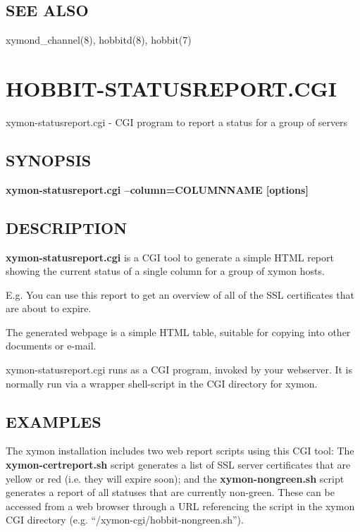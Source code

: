 \subsection{SEE ALSO}
xymond\_channel(8), hobbitd(8), hobbit(7) 

 
%
\newpage
\section{HOBBIT-STATUSREPORT.CGI}

 xymon-statusreport.cgi - CGI program to report a status for a group
 of servers
 \subsection{SYNOPSIS}
\textbf{xymon-statusreport.cgi --column=COLUMNNAME [options]}


 
\subsection{DESCRIPTION}
\textbf{xymon-statusreport.cgi} is a CGI tool to generate a simple
HTML report showing the current status of a single column for a group
of xymon hosts. 


  E.g. You can use this report to get an overview of all of the SSL certificates that are about to expire. 


  The generated webpage is a simple HTML table, suitable for copying into other documents or e-mail. 


  xymon-statusreport.cgi runs as a CGI program, invoked by your webserver. It is normally run via a wrapper shell-script in the CGI directory for xymon. 


 
\subsection{EXAMPLES}
 The xymon installation includes two web report scripts using this
 CGI tool: The \textbf{xymon-certreport.sh} script generates a list
 of SSL server certificates that are yellow or red (i.e. they will
 expire soon); and the \textbf{xymon-nongreen.sh} script generates a
 report of all statuses that are currently non-green. These can be
 accessed from a web browser through a URL referencing the script in
 the xymon CGI directory (e.g. ``/xymon-cgi/hobbit-nongreen.sh''). 


